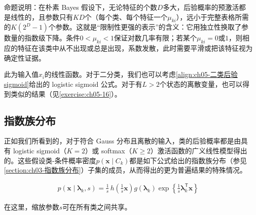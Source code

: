 \documentclass[../../main.tex]{subfiles}
\begin{document}
\begin{remark}
命题说明：在朴素 Bayes 假设下，无论特征的个数$D$多大，后验概率的预激活都是线性的，且参数只有$KD$个（每个类、每个特征一个$\mu_{ki}$），远小于完整表格所需的$K(2^{D}-1)$个参数。这就是“限制性更强的表示”的含义：它用独立性换取了参数量的指数级下降。条件$0<\mu_{ki}<1$保证对数几率有限；若某个$\mu_{ki}=0$或$1$，则相应的特征在该类中从不出现或总是出现，系数发散，此时需要平滑或把该特征视为确定性证据。
\end{remark}

此为输入值$x_i$的线性函数。对于二分类，我们也可以考虑\eqref{align:ch05-二类后验sigmoid}给出的 logistic sigmoid 公式。对于有$L>2$个状态的离散变量，也可以得到类似的结果（见\cref{exercise:ch05-16}）。

\subsection{指数族分布}\label{subsection:ch05-指数族分布}

正如我们所看到的，对于符合 Gauss 分布且离散的输入，类的后验概率都是由具有 logistic sigmoid（$K=2$）或 softmax（$K\geqslant 2$）激活函数的广义线性模型得出的。这些假设类-条件概率密度$p(\boldsymbol{x}\mid C_k)$都是如下公式给出的指数族分布（参见\cref{section:ch03-指数族分布}）子集的成员，从而得出的更为普遍结果的特殊情况。

\begin{align}
  p(\boldsymbol{x}\mid\boldsymbol{\lambda}_k,s)=\frac{1}{s}\,h\left(\frac{1}{s}\boldsymbol{x}\right)g(\boldsymbol{\lambda}_k)\exp\left\{\frac{1}{s}\boldsymbol{\lambda}_k^{\mathsf{T}}\boldsymbol{x}\right\}
  \label{align:ch05-指数族密度}
\end{align}

在这里，缩放参数$s$可在所有类之间共享。
\end{document}
